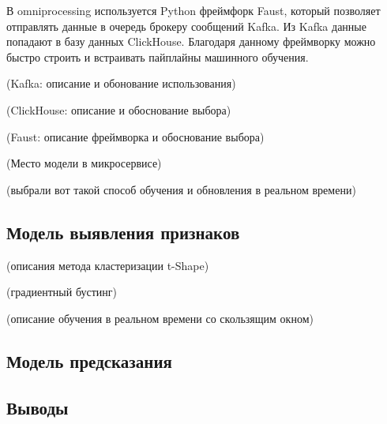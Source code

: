 В omniprocessing используется Python фреймфорк Faust, который позволяет отправлять
данные в очередь брокеру сообщений Kafka. Из Kafka данные попадают в базу данных ClickHouse.
Благодаря данному фреймворку можно быстро строить и встраивать пайплайны машинного обучения. \cite{faust}

(Kafka: описание и обонование использования)

(ClickHouse: описание и обоснование выбора)

(Faust: описание фреймворка и обоснование выбора)

(Место модели в микросервисе)

(выбрали вот такой способ обучения и обновления в реальном времени)

\subsection{Модель выявления признаков}

(описания метода кластеризации t-Shape)

(градиентный бустинг)

(описание обучения в реальном времени со скользящим окном)

\subsection{Модель предсказания}

\subsection{Выводы}

\clearpage